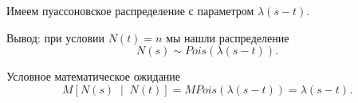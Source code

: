 Имеем пуассоновское распределение с параметром $ \lambda \left( s - t \right) $.

Вывод: при условии $N \left( t \right) = n$ мы нашли распределение
$$N \left( s \right) \sim Pois \left( \lambda \left( s - t \right) \right).$$

Условное математическое ожидание
$$M \left[ N \left( s \right) \; \middle| \; N \left( t \right) \right] =
  MPois \left( \lambda \left( s - t \right) \right) =
  \lambda \left( s - t \right).$$
